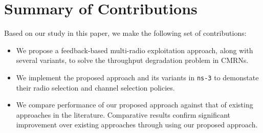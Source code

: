 
\section{Summary of Contributions}

Based on our study in this paper, we make the following set of contributions:

\begin{itemize}
\item We propose a feedback-based multi-radio exploitation approach, along with several variants, to solve the throughput degradation problem in CMRNs.
\item We implement the proposed approach and its variants in \texttt{ns-3} to demonstate their radio selection and channel selection policies.
\item We compare performance of our proposed approach against that of existing approaches in the literature. Comparative results confirm significant improvement over existing approaches through using our proposed approach.
\end{itemize}
\endinput
